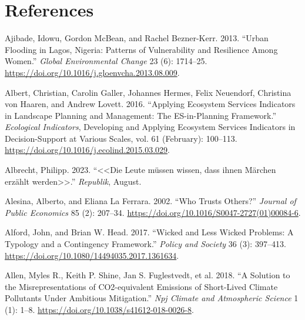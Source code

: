 \documentclass[
  a4paper,
  DIV=11,
  numbers=noendperiod,
  oneside,
  openany]{scrreprt}
\newlength{\cslhangindent}
\newenvironment{CSLReferences}[2] %
 {\begin{list}{}{%
  \setlength{\itemindent}{0pt}
  \setlength{\leftmargin}{0pt}
  \setlength{\parsep}{0pt}
  \ifodd #1
   \setlength{\leftmargin}{\cslhangindent}
   \setlength{\itemindent}{-1\cslhangindent}
  \fi
  \setlength{\itemsep}{#2\baselineskip}}}
 {\end{list}}
\begin{document}

\chapter*{References}\label{references}


\protect{}\label{refs}
\begin{CSLReferences}{1}{1}
Ajibade, Idowu, Gordon McBean, and Rachel Bezner-Kerr. 2013. {``Urban
Flooding in {Lagos}, {Nigeria}: {Patterns} of Vulnerability and
Resilience Among Women.''} \emph{Global Environmental Change} 23 (6):
1714--25. \url{https://doi.org/10.1016/j.gloenvcha.2013.08.009}.

{Albert, Christian, Carolin Galler, Johannes Hermes, Felix Neuendorf,
Christina von Haaren, and Andrew Lovett}. 2016. {``Applying Ecosystem
Services Indicators in Landscape Planning and Management: {The
ES-in-Planning} Framework.''} \emph{Ecological Indicators}, Developing
and {Applying Ecosystem Services Indicators} in {Decision-Support} at
{Various Scales}, vol. 61 (February): 100--113.
\url{https://doi.org/10.1016/j.ecolind.2015.03.029}.

Albrecht, Philipp. 2023. {``{\textless\textless Die Leute m{ü}ssen
wissen, dass ihnen M{ä}rchen erz{ä}hlt
werden\textgreater\textgreater{}}.''} \emph{Republik}, August.

Alesina, Alberto, and Eliana La Ferrara. 2002. {``Who Trusts Others?''}
\emph{Journal of Public Economics} 85 (2): 207--34.
\url{https://doi.org/10.1016/S0047-2727(01)00084-6}.

Alford, John, and Brian W. Head. 2017. {``Wicked and Less Wicked
Problems: A Typology and a Contingency Framework.''} \emph{Policy and
Society} 36 (3): 397--413.
\url{https://doi.org/10.1080/14494035.2017.1361634}.

Allen, Myles R., Keith P. Shine, Jan S. Fuglestvedt, et al. 2018. {``A
Solution to the Misrepresentations of {CO2-equivalent} Emissions of
Short-Lived Climate Pollutants Under Ambitious Mitigation.''} \emph{Npj
Climate and Atmospheric Science} 1 (1): 1--8.
\url{https://doi.org/10.1038/s41612-018-0026-8}.


\end{CSLReferences}
\end{document}
